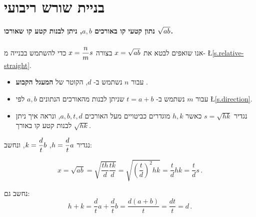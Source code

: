 \section{%
בניית שורש ריבועי%
}\label{s.root}

\textbf{%
נתון קטעי קו באורכים
$a,b$,
ניתן לבנות קטע קו שאורכו
$\rule[-5pt]{0pt}{10pt}\sqrt{ab}$.}

אנו שואפים לבטא את
$\rule[-5pt]{0pt}{20pt}x=\sqrt{ab}$
בצורה
$x=\displaystyle\frac{n}{m}s$
כדי להשתמש בבנייה מ-%
\L{\ref{s.relative-straight}}.
\vspace*{-1ex}
\begin{itemize}
\setlength{\itemsep}{0pt}
\item עבור
$n$
נשתמש ב-%
$d$,
הקוטר של
\textbf{%
המעגל הקבוע%
}.
\item עבור
$m$
נשתמש ב-%
$t=a+b$
שניתן לבנות מהאורכים הנתונים
$a,b$
לפי
\L{\ref{s.direction}}.
\item 
נגדיר
$s=\sqrt{hk}$
כאשר 
$h,k$
מוגדרים כביטויים מעל האורכים
$a,b,t,d$,
ונראה איך ניתן לבנות קטע קו באורך 
$\sqrt{hk}$.
\end{itemize}
\vspace{-1ex}
נגדיר
$h=\displaystyle\frac{d}{t}a$, $k=\displaystyle\frac{d}{t}b$,
ונחשב:
\vspace{-2ex}

\[
x=\sqrt{ab}=\sqrt{\frac{th}{d}\frac{tk}{d}}=\sqrt{\left(\frac{t}{d}\right)^2hk}=\frac{t}{d}hk=\frac{t}{d}s\,.
\]
\vspace{-2ex}

נחשב גם: 
\[
h+k = \frac{d}{t}a + \frac{d}{t}b = \frac{d(a+b)}{t} = \frac{dt}{t} = d\,.
\]

\vspace{-2ex}

